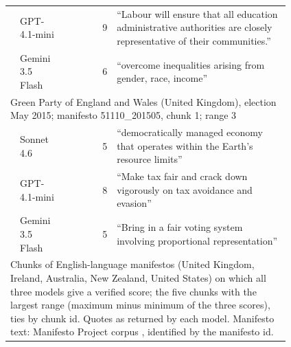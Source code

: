 {\begin{longtable}{p{0.02\linewidth}p{0.17\linewidth}rp{0.62\linewidth}}
 & GPT-4.1-mini & 9 & ``Labour will ensure that all education administrative authorities are closely representative of their communities.'' \\
 & Gemini 3.5 Flash & 6 & ``overcome inequalities arising from gender, race, income'' \\
\midrule
\multicolumn{4}{p{0.96\linewidth}}{Green Party of England and Wales (United Kingdom), election May 2015; manifesto 51110\_201505, chunk 1; range 3} \\
 & Sonnet 4.6 & 5 & ``democratically managed economy that operates within the Earth's resource limits'' \\
 & GPT-4.1-mini & 8 & ``Make tax fair and crack down vigorously on tax avoidance and evasion'' \\
 & Gemini 3.5 Flash & 5 & ``Bring in a fair voting system involving proportional representation'' \\
\bottomrule
\multicolumn{4}{p{0.96\linewidth}}{\scriptsize Chunks of English-language manifestos (United Kingdom, Ireland, Australia, New Zealand, United States) on which all three models give a verified score; the five chunks with the largest range (maximum minus minimum of the three scores), ties by chunk id. Quotes as returned by each model. Manifesto text: Manifesto Project corpus \citep{lehmann2026manifesto}, identified by the manifesto id.} \\
\end{longtable}
}
